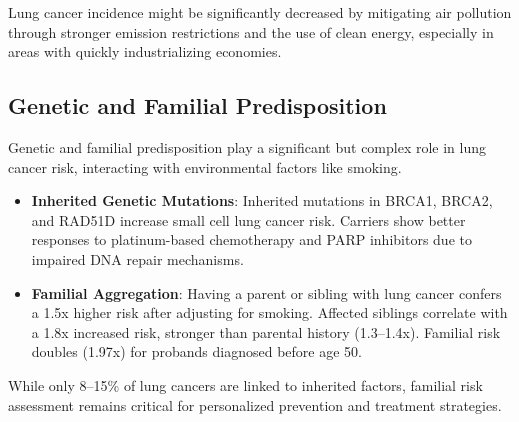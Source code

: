 Lung cancer incidence might be significantly decreased by mitigating air pollution through stronger 
emission restrictions and the use of clean energy, especially in areas with quickly industrializing 
economies.


\subsection{Genetic and Familial Predisposition}

Genetic and familial predisposition play a significant but complex role in lung cancer risk, 
interacting with environmental factors like smoking.

\begin{itemize}
    \item \textbf{Inherited Genetic Mutations}: Inherited mutations in BRCA1, BRCA2, and RAD51D 
    increase small cell lung cancer risk. Carriers show better responses to platinum-based 
    chemotherapy and PARP inhibitors due to impaired DNA repair mechanisms. 

    \item \textbf{Familial Aggregation}: Having a parent or sibling with lung cancer confers a 1.5x 
    higher risk after adjusting for smoking. Affected siblings correlate with a 1.8x increased risk, 
    stronger than parental history (1.3–1.4x). Familial risk doubles (1.97x) for probands diagnosed 
    before age 50. \cite{eur2012}
\end{itemize}

While only 8–15\% of lung cancers \cite{ol2017} are linked to inherited factors, familial risk 
assessment remains critical for personalized prevention and treatment strategies.



